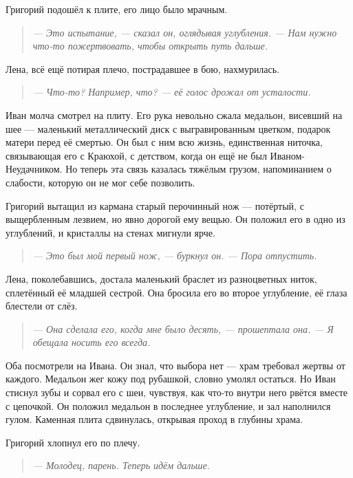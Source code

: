 \documentclass[12pt,a4paper]{book}
\newenvironment{dialogue}{\begin{quote}\itshape}{\end{quote}}
\begin{document}
Григорий подошёл к плите, его лицо было мрачным.

\begin{dialogue}
--- Это испытание, --- сказал он, оглядывая углубления. --- Нам нужно что-то пожертвовать, чтобы открыть путь дальше.
\end{dialogue}

Лена, всё ещё потирая плечо, пострадавшее в бою, нахмурилась.

\begin{dialogue}
--- Что-то? Например, что? --- её голос дрожал от усталости.
\end{dialogue}

Иван молча смотрел на плиту. Его рука невольно сжала медальон, висевший на шее --- маленький металлический диск с выгравированным цветком, подарок матери перед её смертью. Он был с ним всю жизнь, единственная ниточка, связывающая его с Краюхой, с детством, когда он ещё не был Иваном-Неудачником. Но теперь эта связь казалась тяжёлым грузом, напоминанием о слабости, которую он не мог себе позволить.

Григорий вытащил из кармана старый перочинный нож --- потёртый, с выщербленным лезвием, но явно дорогой ему вещью. Он положил его в одно из углублений, и кристаллы на стенах мигнули ярче.

\begin{dialogue}
--- Это был мой первый нож, --- буркнул он. --- Пора отпустить.
\end{dialogue}

Лена, поколебавшись, достала маленький браслет из разноцветных ниток, сплетённый её младшей сестрой. Она бросила его во второе углубление, её глаза блестели от слёз.

\begin{dialogue}
--- Она сделала его, когда мне было десять, --- прошептала она. --- Я обещала носить его всегда.
\end{dialogue}

Оба посмотрели на Ивана. Он знал, что выбора нет --- храм требовал жертвы от каждого. Медальон жег кожу под рубашкой, словно умолял остаться. Но Иван стиснул зубы и сорвал его с шеи, чувствуя, как что-то внутри него рвётся вместе с цепочкой. Он положил медальон в последнее углубление, и зал наполнился гулом. Каменная плита сдвинулась, открывая проход в глубины храма.

Григорий хлопнул его по плечу.

\begin{dialogue}
--- Молодец, парень. Теперь идём дальше.
\end{dialogue}
\end{document}
